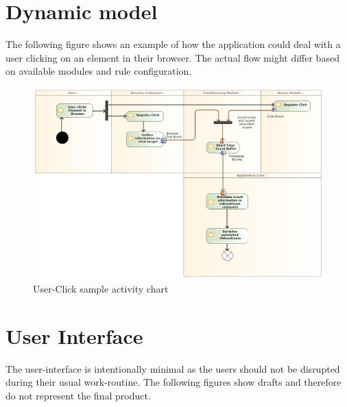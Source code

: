 \section{Dynamic model} %
The following figure shows an example of how the application could deal with a \gls{user} clicking on an element in their \gls{browser}. The actual flow might differ based on available modules and rule configuration.
\begin{figure}[H]
  \includegraphics[width=1.00\textwidth]{resources/clickactivity.png}
  \centering
  \caption{User-Click sample activity chart}
  \label{fig:clickactivity}
\end{figure}
\newpage %
\section{User Interface}
The \gls{user}-interface is intentionally minimal as the \glspl{user} should not be disrupted during their usual work-routine. The following figures show drafts and therefore do not represent the final product.

